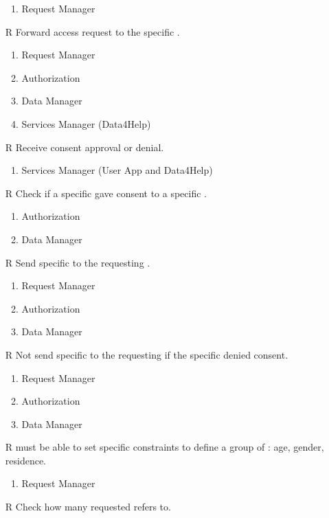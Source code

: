 \begin{itemize}
\begin{enumerate}
		\item Request Manager
	\end{enumerate}
	\item[R\subs{16}]Forward  access request to the specific .
	\begin{enumerate}
		\item Request Manager
		\item Authorization
		\item Data Manager
		\item Services Manager (Data4Help)
	\end{enumerate}
	\item[R\subs{17}]Receive  consent approval or denial.
	\begin{enumerate}
		\item Services Manager (User App and Data4Help)
	\end{enumerate}
	\item[R\subs{18}]Check if a specific  gave consent to a specific .
	\begin{enumerate}
		\item Authorization
		\item Data Manager
	\end{enumerate}
	\item[R\subs{19}]Send specific to the requesting .
	\begin{enumerate}
		\item Request Manager
		\item Authorization
		\item Data Manager
	\end{enumerate}
	\item[R\subs{20}]Not send specific to the requesting  if the specific  denied consent.
	\begin{enumerate}
		\item Request Manager
		\item Authorization
		\item Data Manager
	\end{enumerate}
	\item[R\subs{21}] must be able to set specific constraints to define a group of : age, gender, residence.
	\begin{enumerate}
		\item Request Manager
	\end{enumerate}
	\item[R\subs{22}]Check how many  requested  refers to.

\end{itemize}
